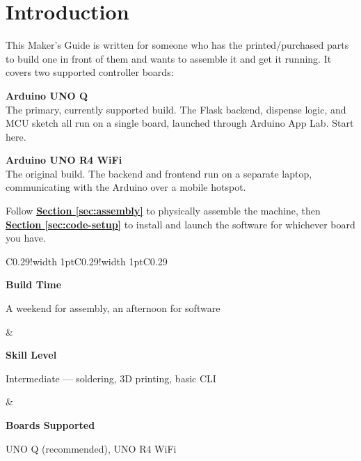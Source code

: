 \documentclass[11pt, letterpaper]{article}
\newcommand{\ticon}[1]{%
  \tikz[baseline=-0.55ex]{\node[circle, draw=white, line width=0.7pt, text=white,
    font=\bfseries\fontsize{6.5}{6.5}\selectfont, inner sep=0pt, minimum size=1.25em] {#1};}%
}
\newcommand{\secref}[1]{%
  \hyperref[#1]{\textbf{\textcolor{terracottadark}{Section \ref{#1}}}}%
}
\begin{document}
\pagecolor{white}\color{black}
\newpage
{\hypersetup{linkcolor=terracottadark}\tableofcontents}
\newpage

\section{Introduction}

This Maker's Guide is written for someone who has the printed/purchased parts to build one in front of them and wants to assemble it and get it running. It covers two supported controller boards:

\textbf{\textcolor{terracottadark}{Arduino UNO Q}}\\
The primary, currently supported build. The Flask backend,
dispense logic, and MCU sketch all run on a single board,
launched through Arduino App Lab. Start here.

\vspace{0.5em}

\textbf{\textcolor{terracottadark}{Arduino UNO R4 WiFi}}\\
The original build. The backend and frontend run on a
separate laptop, communicating with the Arduino over a
mobile hotspot.

Follow \secref{sec:assembly} to physically assemble the machine, then \secref{sec:code-setup} to install and launch the software for whichever board you have.

\begin{tcolorbox}[notebox, title={\ticon{i}\ At a Glance}]
\centering

\begin{tabular}{C{0.29\linewidth}!{\color{gold}\vrule width 1pt}C{0.29\linewidth}!{\color{gold}\vrule width 1pt}C{0.29\linewidth}}

\hspace*{-0.65cm}%
\parbox[c]{\linewidth}{\centering
{\small\textbf{\textcolor{terracottadark}{Build Time}}}\\[4pt]
\begin{minipage}{0.9\linewidth}
\centering\footnotesize
A weekend for assembly, an afternoon for software
\end{minipage}
}
&
\hspace*{0cm}%
\parbox[c]{\linewidth}{\centering
{\small\textbf{\textcolor{terracottadark}{Skill Level}}}\\[4pt]
\begin{minipage}{0.9\linewidth}
\centering\footnotesize
Intermediate --- soldering, 3D printing, basic CLI
\end{minipage}
}
&
\hspace*{0.35cm}%
\parbox[c]{\linewidth}{\centering
{\small\textbf{\textcolor{terracottadark}{Boards Supported}}}\\[4pt]
\begin{minipage}{0.9\linewidth}
\centering\footnotesize
UNO Q (recommended), UNO R4 WiFi
\end{minipage}
}

\end{tabular}
\end{tcolorbox}
\end{document}
